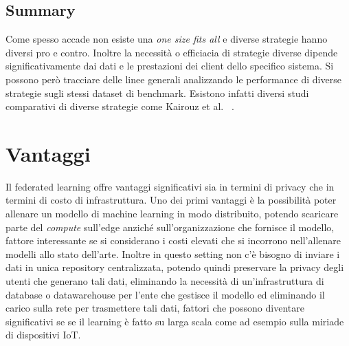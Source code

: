 \subsection{Summary}
Come spesso accade non esiste una \textit{one size fits all} e diverse 
strategie hanno diversi pro e contro. Inoltre la necessità o efficiacia 
di strategie diverse dipende significativamente dai dati e le prestazioni 
dei client dello specifico sistema. Si possono però tracciare delle 
linee generali analizzando le performance di diverse strategie sugli 
stessi dataset di benchmark. Esistono infatti diversi studi comparativi 
di diverse strategie come Kairouz et al.  ~\cite{kairouz2021flOpenProblems}.


\section{Vantaggi}
Il federated learning offre vantaggi significativi sia in termini di 
privacy che in termini di costo di infrastruttura. 
Uno dei primi  vantaggi è la possibilità poter allenare un modello 
di machine learning in modo distribuito, potendo scaricare parte del 
\textit{compute} sull'edge anziché sull'organizzazione che fornisce 
il modello, fattore interessante se si considerano i costi elevati che 
si incorrono nell'allenare modelli allo stato dell'arte.
Inoltre in questo setting non c'è bisogno di inviare i dati in unica 
repository centralizzata, potendo quindi preservare la privacy degli
utenti che generano tali dati, eliminando la necessità di 
un'infrastruttura di database o datawarehouse per l'ente che gestisce
il modello ed eliminando il carico sulla rete per trasmettere tali
dati, fattori che possono diventare significativi se se il learning è
fatto su larga scala come ad esempio sulla miriade di dispositivi IoT.

